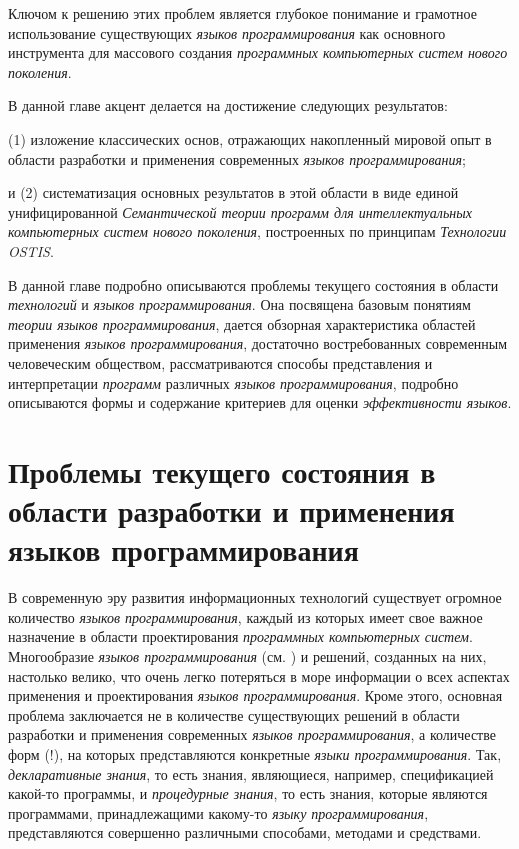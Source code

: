 Ключом к решению этих проблем является глубокое понимание и грамотное использование существующих \textit{языков программирования} как основного инструмента для массового создания \textit{программных компьютерных систем нового поколения}.

В данной главе акцент делается на достижение следующих результатов:
\begin{textitemize}
    \item (1) изложение классических основ, отражающих накопленный мировой опыт в области разработки и применения современных \textit{языков программирования};
    \item и (2) систематизация основных результатов в этой области в виде единой унифицированной \textit{Семантической теории программ для интеллектуальных компьютерных систем нового поколения}, построенных по принципам \textit{Технологии OSTIS}.
\end{textitemize}

В данной главе подробно описываются проблемы текущего состояния в области \textit{технологий} и \textit{языков программирования}. Она посвящена базовым понятиям \textit{теории языков программирования}, дается обзорная характеристика областей применения \textit{языков программирования}, достаточно востребованных современным человеческим обществом, рассматриваются способы представления и интерпретации \textit{программ} различных \textit{языков программирования}, подробно описываются формы и содержание критериев для оценки \textit{эффективности языков}.

\section{Проблемы текущего состояния в области разработки и применения языков программирования}
\label{sec_programs_problems_and_tasks}

В современную эру развития информационных технологий существует огромное количество \textit{языков программирования}, каждый из которых имеет свое важное назначение в области проектирования \textit{программных компьютерных систем}. Многообразие \textit{языков программирования} (см. ) и решений, созданных на них, настолько велико, что очень легко потеряться в море информации о всех аспектах применения и проектирования \textit{языков программирования}. Кроме этого, основная проблема заключается не в количестве существующих решений в области разработки и применения современных \textit{языков программирования}, а количестве форм (!), на которых представляются конкретные \textit{языки программирования}. Так, \textit{декларативные знания}, то есть знания, являющиеся, например, спецификацией какой-то программы, и \textit{процедурные знания}, то есть знания, которые являются программами, принадлежащими какому-то \textit{языку программирования}, представляются совершенно различными способами, методами и средствами.

